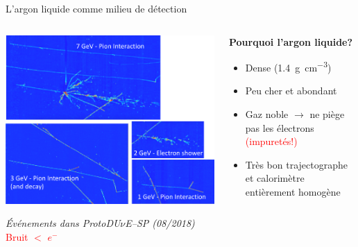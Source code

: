    \begin{frame}{L'argon liquide comme milieu de détection}
        \begin{scriptsize}
           	\begin{columns}
           		\begin{column}{0.6\textwidth}
           			\centering
           			\includegraphics[width=\textwidth]{./pictures/SP_evt.png}\\
           			\flushleft
           			\begin{footnotesize}\textit{Événements dans ProtoDU$\nu$E--SP (08/2018)}\\
           			\textcolor{red}{Bruit $<$  $e^{-}$}\end{footnotesize}
           		\end{column}
           		\begin{column}{0.4\textwidth}
           			\begin{footnotesize}
           				\textbf{Pourquoi l'argon liquide?}
           			\end{footnotesize}
           			\begin{itemize}
           				\item Dense (\SI{1.4}{\gram\per\centi\meter^3})
           				\item Peu cher et abondant
           				\item Gaz noble $\rightarrow$ ne piège pas les électrons \textcolor{red}{(\danger impuretés!)}
           				\item Très bon trajectographe et calorimètre entièrement homogène

\end{itemize}
\end{column}
\end{columns}
\end{scriptsize}
\end{frame}
